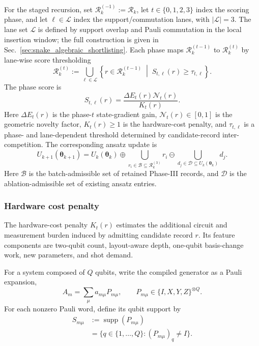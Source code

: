 \documentclass[
  reprint,
  amsmath,
  amssymb,
  aps,
  pra,
  nofootinbib,
  superscriptaddress,
  floatfix
]{revtex4-2}
\begin{document}
For the staged recursion, set $\mathcal R_k^{(-1)}:=\mathcal R_k$, let $t\in\{0,1,2,3\}$ index the scoring phase, and let $\ell\in\mathcal L$ index the support/commutation lanes, with \(|\mathcal L|=3\). The lane set $\mathcal L$ is defined by support overlap and Pauli commutation in the local insertion window; the full construction is given in Sec.~\ref{sec:snake_algebraic_shortlisting}.
Each phase maps $\mathcal R_k^{(t-1)}$ to $\mathcal R_k^{(t)}$ by lane-wise score thresholding
\begin{equation}
\mathcal R_k^{(t)}
:=
\bigcup_{\ell\in\mathcal L}
\left\{
r\in\mathcal R_k^{(t-1)}
\;\middle|\;
S_{t,\ell}(r)\ge\tau_{t,\ell}
\right\}.
\label{eq:phase_restriction_map}
\end{equation}
The phase score is
\begin{equation}
S_{t,\ell}(r)
=
\frac{\Delta E_t(r)\mathcal N_t(r)}{K_t(r)}.
\label{eq:master_phase_score}
\end{equation}
Here $\Delta E_t(r)$ is the phase-$t$ state-gradient gain, $\mathcal N_t(r)\in[0,1]$ is the geometric novelty factor, \(K_t(r)\geq 1\) is the hardware-cost penalty, and \(\tau_{t,\ell}\) is a phase- and lane-dependent threshold determined by candidate-record inter-competition. The corresponding ansatz update is
\begin{equation}
U_{k+1}(\boldsymbol\theta_{k+1})
=
U_k(\boldsymbol\theta_k)
\oplus
\bigcup_{r_i\in\mathcal B\subseteq\mathcal R_k^{(3)}}r_i
\ominus
\bigcup_{d_j\in\mathcal D\subseteq U_k(\boldsymbol\theta_k)}d_j .
\label{eq:snake_ansatz_update}
\end{equation}
Here $\mathcal B$ is the batch-admissible set of retained Phase-III records, and $\mathcal D$ is the ablation-admissible set of existing ansatz entries.

\subsubsection{Hardware cost penalty}

The hardware-cost penalty \(K_t(r)\) estimates the additional circuit and measurement burden induced by admitting candidate record \(r\). Its feature components are two-qubit count, layout-aware depth, one-qubit basis-change work, new parameters, and shot demand.

For a system composed of $Q$ qubits, write the compiled generator as a Pauli expansion, $$A_m=\sum_{\mu}a_{m\mu}P_{m\mu}, \qquad P_{m\mu}\in\{I,X,Y,Z\}^{\otimes Q}.$$ For each nonzero Pauli word, define its qubit support by
\begin{equation}
\begin{aligned}
S_{m\mu}
&:=\operatorname{supp}(P_{m\mu}) \\
&=\{q\in\{1,\ldots,Q\}:(P_{m\mu})_q\ne I\}.
\end{aligned}
\label{eq:pauli_word_support}
\end{equation}
\end{document}
